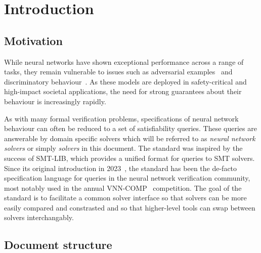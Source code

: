 \chapter{Introduction}
\label{sec:intro}

\section{Motivation}

While neural networks have shown exceptional performance across a range of tasks, 
they remain vulnerable to issues such as adversarial examples~\cite{szegedy2013intriguing} and discriminatory behaviour~\cite{buolamwini2018gender}. As these models are deployed in safety-critical and high-impact societal applications, the need for strong guarantees about their behaviour is increasingly rapidly.

As with many formal verification problems, specifications of neural network behaviour can often be reduced to a set of satisfiability queries. These queries are answerable by domain specific solvers which will be referred to as \emph{neural network solvers} or simply \emph{solvers} in this document. 
The \vnnlib{} standard was inspired by the success of SMT-LIB, which provides a unified format for queries to SMT solvers. 
Since its original introduction in 2023~\cite{demarchi2023supporting}, the \vnnlib{} standard has been the de-facto specification language for queries in the neural network verification community, most notably used in the annual VNN-COMP~\cite{brix2023first, bak2021second, muller2022third, brix2023fourth, brix2024fifth} competition. 
The goal of the standard is to facilitate a common solver interface so that solvers can be more easily compared and constrasted and so that higher-level tools can swap between solvers interchangably. 

\section{Document structure}

